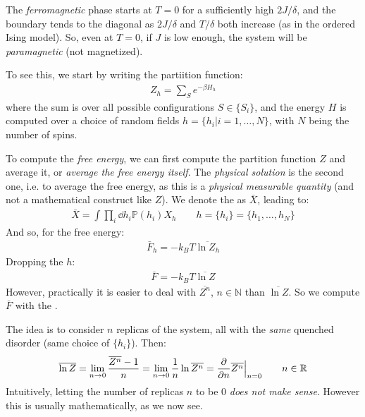 \documentclass[../template.tex]{subfiles}
\begin{document}
The \textit{ferromagnetic} phase starts at $T=0$ for a sufficiently high $2J/\delta$, and the boundary tends to the diagonal as $2J/\delta$ and $T/\delta$ both increase (as in the ordered Ising model). So, even at $T=0$, if $J$ is low enough, the system will be \textit{paramagnetic} (not magnetized). 

To see this, we start by writing the partiition function:
\begin{align*}
    Z_h = \sum_S e^{- \beta H_h}
\end{align*}
where the sum is over all possible configurations $S \in \{S_i\}$, and the energy $H$ is computed over a choice of random fields $h = \{h_i | i=1,\dots,N\}$, with $N$ being the number of spins.

To compute the \textit{free energy}, we can first compute the partition function $Z$ and average it, or \textit{average the free energy itself}. 
The \textit{physical solution} is the second one, i.e. to average the free energy, as this is a \textit{physical measurable quantity} (and not a mathematical construct like $Z$). We denote the  as $\bar{X}$, leading to:
\begin{align*}
    \bar{X} = \int \prod_i \dd{h_i} \mathbb{P}(h_i) X_h \qquad h= \{h_i\} = \{h_1, \dots, h_N\}
\end{align*}   
And so, for the free energy:
\begin{align*}
    \bar{F}_h = - k_B T \overline{\ln Z_h}
\end{align*}
Dropping the $h$:
\begin{align*}
    \bar{F} = -k_B T \overline{\ln Z}
\end{align*} 
However, practically it is easier to deal with $\overline{Z^n}$, $n \in \mathbb{N}$  than $\overline{\ln Z}$. So we compute $\bar{F}$ with the .

The idea is to consider $n$ replicas of the system, all with the \textit{same} quenched disorder (same choice of $\{h_i\}$). Then:
\begin{align*}
    \overline{\ln Z} = \lim_{n \to 0} \frac{\overline{Z^n}-1}{n} = \lim_{n \to 0} \frac{1}{n} \ln \overline{Z^n} = \pdv{n} \overline{Z^n}\Big|_{n = 0} \qquad n \in \mathbb{R}
\end{align*}   
Intuitively, letting the number of replicas $n$ to be $0$ \textit{does not make sense}. However this is usually mathematically, as we now see.    
\end{document}
